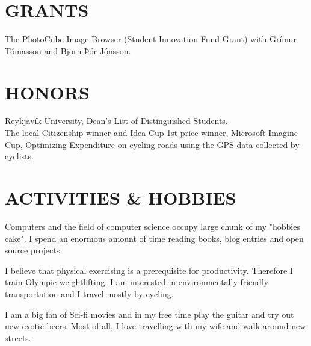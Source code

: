 \documentclass[margin]{res}
\begin{document}
\begin{resume}
\section{GRANTS}
The PhotoCube Image Browser
(Student Innovation Fund Grant) with Grímur Tómasson and Björn Þór Jónsson.

\section{HONORS}
Reykjavík University, Dean’s List of Distinguished Students.\\
The local Citizenship winner and Idea Cup 1st price winner, Microsoft Imagine
Cup, Optimizing Expenditure on cycling roads using the GPS data collected by
cyclists.

\section{ACTIVITIES \& HOBBIES}
Computers and the field of computer science occupy large chunk of my "hobbies
cake". I spend an enormous amount of time reading books, blog entries and open
source projects.

I believe that physical exercising is a prerequisite for productivity.
Therefore I train Olympic weightlifting. I am interested in environmentally
friendly transportation and I travel mostly by cycling.

I am a big fan of Sci-fi movies and in my free time play the guitar and try out
new exotic beers. Most of all, I love travelling with my wife and walk around
new streets.
\end{resume}
\end{document}

